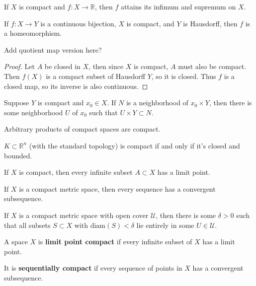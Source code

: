 \documentclass[twoside,10pt]{report}
\begin{document}
\begin{thrm}
If $X$ is compact and $f:X\to \mathbb{R}$, then $f$ attains its infimum and supremum on $X$.
\end{thrm}

\begin{cor}
	If $f:X\to Y$ is a continuous bijection, $X$ is compact, and $Y$ is Hausdorff, then $f$ is a homeomorphism.

	{\color{red}Add quotient map version here?}
\end{cor}
\begin{proof}
	Let $A$ be closed in $X$, then since $X$ is compact, $A$ must also be compact. Then $f(X)$ is a compact subset of Hausdorff $Y$, so it is closed. Thus $f$ is a closed map, so its inverse is also continuous.
\end{proof}

\begin{lem}
	Suppose $Y$ is compact and $x_0 \in X$. If $N$ is a neighborhood of $x_0 \times Y$, then there is some neighborhood $U$ of $x_0$ such that $U \times Y \subset N$.
\end{lem}

\begin{thrm}[Tychonoff]
Arbitrary products of compact spaces are compact.
\end{thrm}

\begin{thrm}
	$K \subset \mathbb{R}^{n}$ (with the standard topology) is compact if and only if it's closed and bounded.
\end{thrm}

\begin{prop}
If $X$ is compact, then every infinite subset $A \subset X$ has a limit point.
\end{prop}

\begin{thrm}[]
If $X$ is a compact metric space, then every sequence has a convergent subsequence.
\end{thrm}

\begin{thrm}
	If $X$ is a compact metric space with open cover $\mathcal{U}$, then there is some $\delta>0$ such that all subsets $S\subset X$ with $\text{diam}(S) < \delta$ lie entirely in some $U \in \mathcal{U}$.
\end{thrm}

\begin{defn}[]
A space $X$ is \textbf{limit point compact} if every infinite subset of $X$ has a limit point.

It is \textbf{sequentially compact} if every sequence of points in $X$ has a convergent subsequence.
\end{defn}
\end{document}
